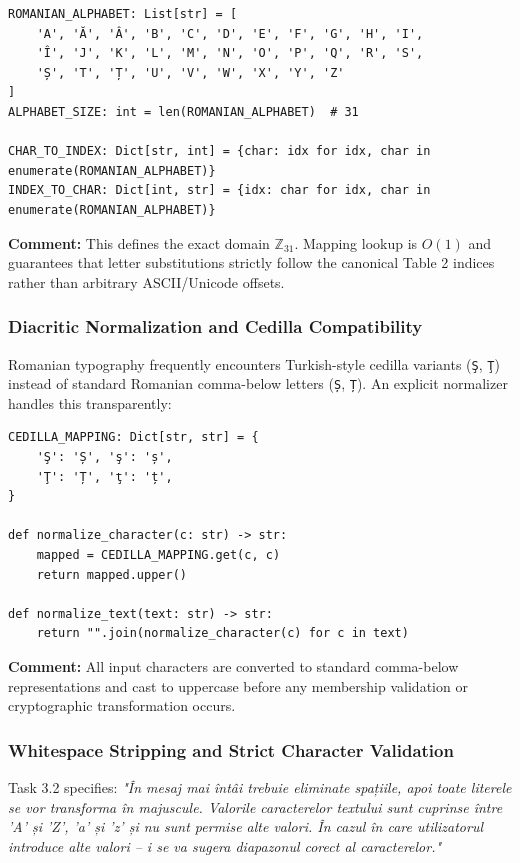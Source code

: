 \documentclass{labreport}
\begin{document}
\begin{lstlisting}[style=python]
ROMANIAN_ALPHABET: List[str] = [
    'A', 'Ă', 'Â', 'B', 'C', 'D', 'E', 'F', 'G', 'H', 'I',
    'Î', 'J', 'K', 'L', 'M', 'N', 'O', 'P', 'Q', 'R', 'S',
    'Ș', 'T', 'Ț', 'U', 'V', 'W', 'X', 'Y', 'Z'
]
ALPHABET_SIZE: int = len(ROMANIAN_ALPHABET)  # 31

CHAR_TO_INDEX: Dict[str, int] = {char: idx for idx, char in enumerate(ROMANIAN_ALPHABET)}
INDEX_TO_CHAR: Dict[int, str] = {idx: char for idx, char in enumerate(ROMANIAN_ALPHABET)}
\end{lstlisting}
\textbf{Comment:} This defines the exact domain $\mathbb{Z}_{31}$. Mapping lookup is $O(1)$ and guarantees that letter substitutions strictly follow the canonical Table 2 indices rather than arbitrary ASCII/Unicode offsets.

\subsubsection{Diacritic Normalization and Cedilla Compatibility}
Romanian typography frequently encounters Turkish-style cedilla variants (\texttt{Ş}, \texttt{Ţ}) instead of standard Romanian comma-below letters (\texttt{Ș}, \texttt{Ț}). An explicit normalizer handles this transparently:

\begin{lstlisting}[style=python]
CEDILLA_MAPPING: Dict[str, str] = {
    'Ş': 'Ș', 'ş': 'ș',
    'Ţ': 'Ț', 'ţ': 'ț',
}

def normalize_character(c: str) -> str:
    mapped = CEDILLA_MAPPING.get(c, c)
    return mapped.upper()

def normalize_text(text: str) -> str:
    return "".join(normalize_character(c) for c in text)
\end{lstlisting}
\textbf{Comment:} All input characters are converted to standard comma-below representations and cast to uppercase before any membership validation or cryptographic transformation occurs.

\subsubsection{Whitespace Stripping and Strict Character Validation}
Task 3.2 specifies: \textit{"În mesaj mai întâi trebuie eliminate spațiile, apoi toate literele se vor transforma în majuscule. Valorile caracterelor textului sunt cuprinse între 'A' și 'Z', 'a' și 'z' și nu sunt permise alte valori. În cazul în care utilizatorul introduce alte valori -- i se va sugera diapazonul corect al caracterelor."}
\end{document}
